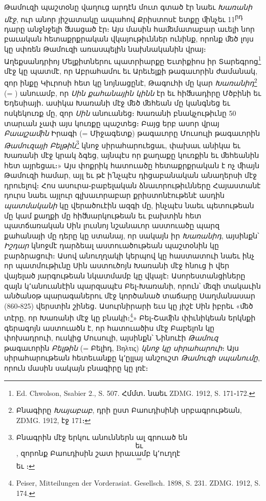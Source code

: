 \documentclass{article}
\newcommand*\svgAAAC{}
\newcommand*\svgAAAD{}
\newcommand*\svgAAAE{}
\newcommand*\svgAAAF{}
\newcommand*\svgAAAG{}
\newcommand*\svgAAAH{}
\begin{document}
{Թամուզի պաշտօնը վաղուց արդէն մուտ գտած էր նաեւ \emph{Խառանի մէջ}, ուր անոր յիշատակը ապահով Քրիստոսէ ետքը ﬕնչեւ 11\textsuperscript{րդ} դարը անջնջելի ﬓացած էր։ Այս մասին հաﬔմատաբար աւելի նոր բաւական հետաքրքրական վկայութիւններ ունինք, որոնք ﬔծ լոյս կը սփռեն Թամուզի առասպելին նախնականին վրայ։ Աղեքսանդրիոյ Մելքիտներու պատրիարքը Եւտիքիոս իր Տարեգրոց\footnote{Ed. Chwolson, Ssabier 2., S. 507. Հմմտ․ նաեւ ZDMG. 1912, S. 171֊172.} մէջ կը պատմէ, որ Աբրահամու եւ Արեւելքի թագաւորին ժամանակ, զոր ինքը Կիւրոսի հետ կը նոյնացընէ, Թագուհի մը կար \emph{Խառանիդ}\footnote{Բնագիրը \emph{Խայաբաբ}, դրի ըստ Բաուդիսինի սրբագրութեան, ZDMG. 1912, էջ 171։} (= $\svgAAAC$) անուամբ, որ \emph{Սին քահանային կինն} էր եւ հիﬓադիրը Մծբինի եւ Եդեսիայի․ ասիկա Խառանի մէջ ﬔծ ﬔհեան մը կանգնեց եւ ոսկեկուռք մը, զոր \emph{Սին} անուանեց։ Խառանի բնակչութիւնը 50 տարւան չափ այս կուռքը պաշտեց։ Բայց երբ ասոր վրայ \emph{Բաալշաﬕն} Իրագի (= Միջագետք) թագաւորը Մուսուլի թագաւորին \emph{Թամուզայի Բելթին}\footnote{Բնագրին մէջ երկու անուններն ալ գրուած են $\svgAAAD$ եւ $\svgAAAE$, զորոնք Բաուդիսին շատ իրաւամբ կ՚ուղղէ $\svgAAAF$ = $\svgAAAG$ եւ $\svgAAAH$։} կնոջ սիրահարուեցաւ, փախաւ անիկա եւ Խառանի մէջ կրակ ձգեց, այնպէս որ քաղաքը կուռքին եւ ﬔհեանին հետ այրեցաւ։» Այս փոքրիկ հատուածը հետաքրքրական է ոչ ﬕայն Թամուզի համար, այլ եւ թէ ի՛նչպէս դիցաբանական անաղերսի մէջ դրուելով։ Հոս ասուրա֊բաբելական ձնաւորութիւնները Հայաստանէ դուրս նաեւ այլուր գլխաւորաբար քրիստոնէութենէ ասդին \emph{պատմականի} կը վերածուէին ազգի մը, ինչպէս նաեւ պետութեան մը կամ քաղքի մը հիﬓարկութեան եւ բախտին հետ պատճառական Սին լուսնոյ նշանաւոր աստուածը պարզ քահանայի մը դերը կը ստանայ, որ սակայն իր \emph{Խառանիդ}, այսինքն՝ \emph{Իշդար} կնոջմէ դարձեալ աստուածութեան պաշտօնին կը բարձրացուի։ Ասով անուղղակի կերպով կը հաստատուի նաեւ ինչ որ պատմութիւնը Սին աստուծոյն Խառանի մէջ հնուց ի վեր վայելած յարգութեան նկատմամբ կը վկայէ։ Ասորեստանցիները զայն կ՚անուանէին պարզապէս Բել֊Խառանի, որուն՝ ﬔզի տակաւին անծանօթ պարագաներու մէջ կործանած տաճարը Սաղմանասար (860֊825) վերստին շինեց․ Ասուրնիրարի եւս կը յիշէ Սին իբրեւ «ﬔծ տէրը, որ Խառանի մէջ կը բնակի։\footnote{Peiser, Mitteilungen der Vorderasiat. Gesellsch. 1898, S. 231. ZDMG. 1912, S. 174.}» Բել֊Շաﬕն փիւնիկեան երկնքի գերագոյն աստուածն է, որ հատուածիս մէջ Բաբելոն կը փոխադրուի, ուսկից Մուսուլի, այսինքն՝ Նինուէի \emph{Թամուզ} թագաւորին \emph{Բելթին} (= Բելիդ, Βηλτις) \emph{կնոջ կը սիրահարուի}։ Այս սիրահարութեան հետեւանքը կ՚ըլլայ անշուշտ \emph{Թամուզի սպանումը}, որուն մասին սակայն բնագիրը կը լռէ։

}
\end{document}
